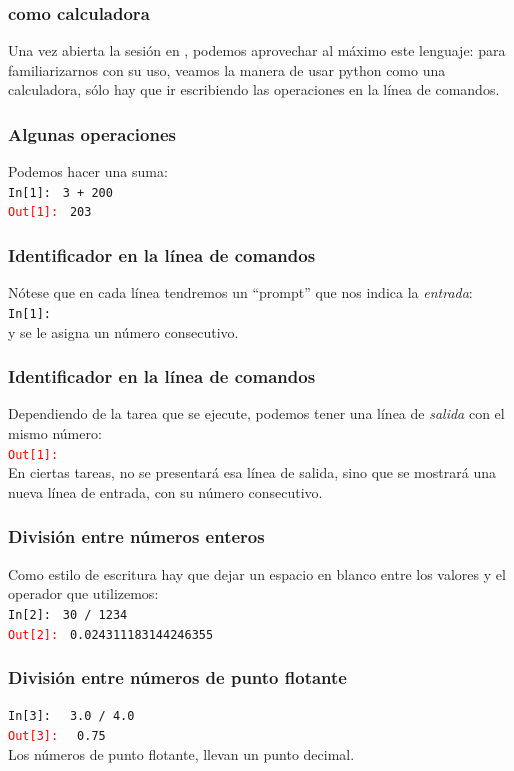 \documentclass[12pt]{beamer}
\begin{document}
\begin{frame}
\frametitle{\python{} como calculadora}
Una vez abierta la sesión en \python, podemos aprovechar al máximo este lenguaje: \pause para familiarizarnos con su uso, veamos la manera de usar python como una calculadora, sólo hay que ir escribiendo las operaciones en la línea de comandos.
\end{frame}

\begin{frame}[fragile]
\frametitle{Algunas operaciones}
Podemos hacer una suma:
\\
\bigskip
\textcolor{ao}{\texttt{In[1]: }} \verb|3 + 200| \\
\pause
\textcolor{red}{\texttt{Out[1]: }} \verb|203|
\end{frame}
\begin{frame}[fragile]
\frametitle{Identificador en la línea de comandos}
Nótese que en cada línea tendremos un \enquote{prompt} que nos indica la \emph{entrada}:
\\
\bigskip
\textcolor{ao}{\texttt{In[1]: }}
\pause
\\
\bigskip
y se le asigna un número consecutivo.
\end{frame}
\begin{frame}[fragile]
\frametitle{Identificador en la línea de comandos}
Dependiendo de la tarea que se ejecute, podemos tener una línea de \emph{salida} con el mismo número:
\\
\bigskip
\textcolor{red}{\texttt{Out[1]: }}
\\
\bigskip
\pause
En ciertas tareas, no se presentará esa línea de salida, sino que se mostrará una nueva línea de entrada, con su número consecutivo.
\end{frame}
\begin{frame}[fragile]
\frametitle{División entre números enteros}
Como estilo de escritura hay que dejar un espacio en blanco entre los valores y el operador que utilizemos:
\\
\bigskip
\textcolor{ao}{\texttt{In[2]: }} \verb|30 / 1234| \\
\pause
\textcolor{red}{\texttt{Out[2]: }} \verb|0.024311183144246355|
\end{frame}
\begin{frame}[fragile]
\frametitle{División entre números de punto flotante}
\bigskip
\textcolor{ao}{\texttt{In[3]: }} \verb| 3.0 / 4.0| \\
\pause
\textcolor{red}{\texttt{Out[3]: }} \verb| 0.75|
\\
\bigskip
\pause
Los números de punto flotante, llevan un punto decimal.
\end{frame}
\end{document}
